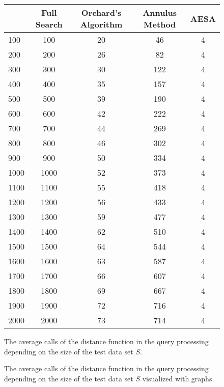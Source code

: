 \documentclass[runningheads,a4paper]{llncs}
\begin{document}
\begin{figure}
	\begin{center}
		\begin{tabular}{ | l | c | c | c | c |}
			\hline
		  	& Full Search & Orchard’s Algorithm & Annulus Method & AESA \\ \hline
		  	100 & 100 & 20 & 46 & 4 \\ \hline
			200 & 200 & 26 & 82 & 4 \\ \hline
			300 & 300 & 30 & 122 & 4 \\ \hline
			400 & 400 & 35 & 157 & 4 \\ \hline
			500 & 500 & 39 & 190 & 4 \\ \hline
			600 & 600 & 42 & 222 & 4 \\ \hline
			700 & 700 & 44 & 269 & 4 \\ \hline
			800 & 800 & 46 & 302 & 4 \\ \hline
			900 & 900 & 50 & 334 & 4 \\ \hline
			1000 & 1000 & 52 & 373 & 4 \\ \hline
			1100 & 1100 & 55 & 418 & 4 \\ \hline
			1200 & 1200 & 56 & 433 & 4 \\ \hline
			1300 & 1300 & 59 & 477 & 4 \\ \hline
			1400 & 1400 & 62 & 510 & 4 \\ \hline
			1500 & 1500 & 64 & 544 & 4 \\ \hline
			1600 & 1600 & 63 & 587 & 4 \\ \hline
			1700 & 1700 & 66 & 607 & 4 \\ \hline
			1800 & 1800 & 69 & 667 & 4 \\ \hline
			1900 & 1900 & 72 & 716 & 4 \\ \hline
			2000 & 2000 & 73 & 714 & 4 \\ \hline
		\end{tabular}
	\end{center}
	\caption{The average calls of the distance function in the query processing depending on the size of the test data
		set $S$.}
	\label{fig:queryprocessing:tabular}
\end{figure}

\begin{figure}
	\begin{center}
	\end{center}
	\caption{The average calls of the distance function in the query processing depending on the size of the test data
		set $S$ visualized with graphs.}
	\label{fig:queryprocessing:graph}
\end{figure}
\end{document}
